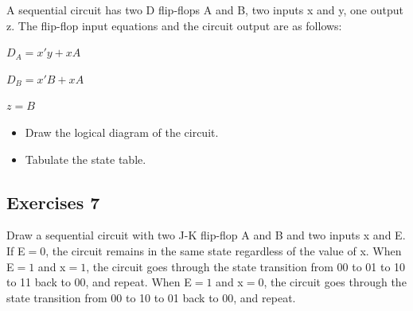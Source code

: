 \documentclass[11pt]{article}
\begin{document}
A sequential circuit has two D flip-flops A and B, two inputs x and y, one output z. The flip-flop input equations and the circuit output are as follows: 
\begin{center}
    $D_A=x'y + xA$
    
    $D_B=x' B+xA$
    
    $z=B$
\end{center}

\begin{itemize}
    \item Draw the logical diagram of the circuit. 
    \item Tabulate the state table. 
\end{itemize}


\subsection*{Exercises 7}
Draw a sequential circuit with two J-K flip-flop A and B and two inputs x and E. If E$=0$, the circuit remains in the same state regardless of the value of x. When E$=1$ and x$=1$, the circuit goes through the state transition from 00 to 01 to 10 to 11 back to 00, and repeat. When E$=1$ and x$=0$, the circuit goes through the state transition from 00 to 10 to 01 back to 00, and repeat. 
\end{document}
